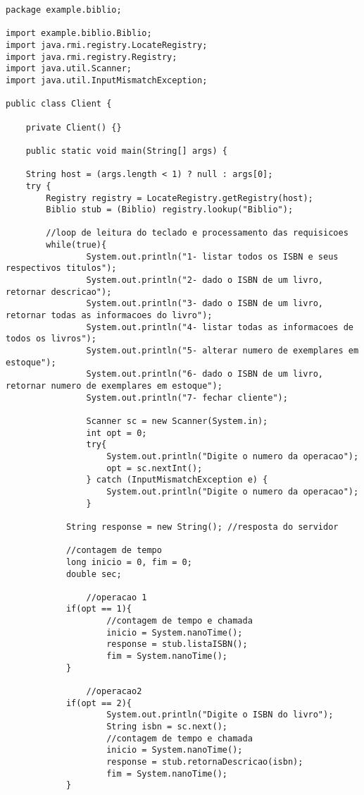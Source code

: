 \documentclass[11pt, brazil]{article} %
\begin{document}
\begin{verbatim}
package example.biblio;

import example.biblio.Biblio;
import java.rmi.registry.LocateRegistry;
import java.rmi.registry.Registry;
import java.util.Scanner;
import java.util.InputMismatchException;

public class Client {

    private Client() {}

    public static void main(String[] args) {

	String host = (args.length < 1) ? null : args[0];
	try {
	    Registry registry = LocateRegistry.getRegistry(host);
	    Biblio stub = (Biblio) registry.lookup("Biblio");
            
	    //loop de leitura do teclado e processamento das requisicoes
	    while(true){
                System.out.println("1- listar todos os ISBN e seus respectivos titulos");
                System.out.println("2- dado o ISBN de um livro, retornar descricao");
                System.out.println("3- dado o ISBN de um livro, retornar todas as informacoes do livro");
                System.out.println("4- listar todas as informacoes de todos os livros");
                System.out.println("5- alterar numero de exemplares em estoque");
                System.out.println("6- dado o ISBN de um livro, retornar numero de exemplares em estoque");
                System.out.println("7- fechar cliente");

                Scanner sc = new Scanner(System.in);
                int opt = 0;
                try{
                    System.out.println("Digite o numero da operacao");
                    opt = sc.nextInt();
                } catch (InputMismatchException e) {
                    System.out.println("Digite o numero da operacao");
                }
	    	
	    	String response = new String(); //resposta do servidor
	    
	    	//contagem de tempo
	    	long inicio = 0, fim = 0;
	    	double sec;
	    	
                //operacao 1
	    	if(opt == 1){
                    //contagem de tempo e chamada
                    inicio = System.nanoTime();
                    response = stub.listaISBN();
                    fim = System.nanoTime();
	    	}

                //operacao2
	    	if(opt == 2){
                    System.out.println("Digite o ISBN do livro");
                    String isbn = sc.next();
                    //contagem de tempo e chamada
                    inicio = System.nanoTime();
                    response = stub.retornaDescricao(isbn);
                    fim = System.nanoTime();
	    	}


\end{verbatim}
\end{document}

